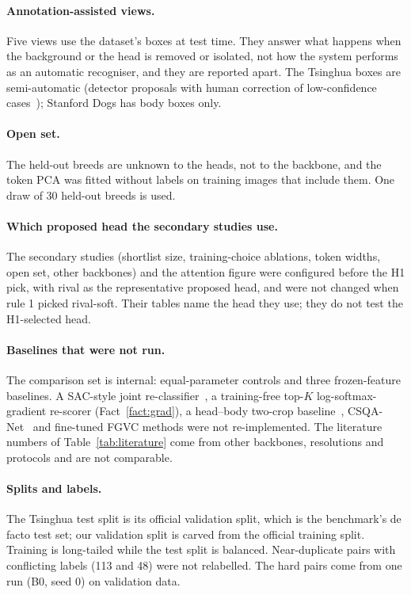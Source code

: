 \documentclass[11pt,a4paper]{article}
\theoremstyle{plain}
\begin{document}
\paragraph{Annotation-assisted views.} Five views use the dataset's boxes at test time. They answer what happens
when the background or the head is removed or isolated, not how the system performs as an automatic recogniser, and
they are reported apart. The Tsinghua boxes are semi-automatic (detector proposals with human correction of
low-confidence cases~\citep{zou2020tsinghuadogs}); Stanford Dogs has body boxes only.

\paragraph{Open set.} The held-out breeds are unknown to the heads, not to the backbone, and the token PCA was fitted
without labels on training images that include them. One draw of 30 held-out breeds is used.

\paragraph{Which proposed head the secondary studies use.} The secondary studies (shortlist size, training-choice
ablations, token widths, open set, other backbones) and the attention figure were configured before the H1 pick, with
rival as the representative proposed head, and were not changed when rule 1 picked rival-soft. Their tables name the
head they use; they do not test the H1-selected head.

\paragraph{Baselines that were not run.} The comparison set is internal: equal-parameter controls and three frozen-feature
baselines. A SAC-style joint re-classifier~\citep{do2024sac}, a training-free top-$K$ log-softmax-gradient
re-scorer (Fact~\ref{fact:grad}), a head--body two-crop baseline~\citep{khan2025headbody}, CSQA-Net~\citep{xu2026csqanet}
and fine-tuned FGVC methods were not re-implemented. The literature numbers of Table~\ref{tab:literature} come from
other backbones, resolutions and protocols and are not comparable.

\paragraph{Splits and labels.} The Tsinghua test split is its official validation split, which is the benchmark's de
facto test set; our validation split is carved from the official training split. Training is long-tailed while the
test split is balanced. Near-duplicate pairs with conflicting labels (113 and 48) were not relabelled. The hard pairs
come from one run (B0, seed 0) on validation data.
\end{document}
